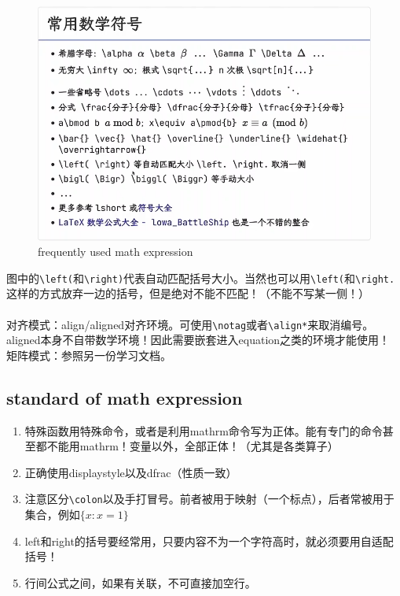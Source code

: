 \documentclass{article}
\begin{document}
\\
\begin{figure}[htbp]
    \includegraphics[scale=0.7]{pic/math-expression.png} \caption{frequently used math expression}\label{pic1}
\end{figure}
图中的\verb|\left(|和\verb|\right)|代表自动匹配括号大小。当然也可以用\verb|\left(|和\verb|\right.|这样的方式放弃一边的括号，但是绝对不能不匹配！（不能不写某一侧！）\\
\\
对齐模式：align/aligned对齐环境。可使用\verb|\notag|或者\verb|\align*|来取消编号。\\
aligned本身不自带数学环境！因此需要嵌套进入equation之类的环境才能使用！
\\
矩阵模式：参照另一份学习文档。
\subsection{standard of math expression}
\begin{enumerate}
    \item 特殊函数用特殊命令，或者是利用mathrm命令写为正体。能有专门的命令甚至都不能用mathrm！变量以外，全部正体！（尤其是各类算子）
    \item 正确使用displaystyle以及dfrac（性质一致）
    \item 注意区分\verb|\colon|以及手打冒号。前者被用于映射（一个标点），后者常被用于集合，例如$\{x:x=1\}$
    \item left和right的括号要经常用，只要内容不为一个字符高时，就必须要用自适配括号！
    \item 行间公式之间，如果有关联，不可直接加空行。
\end{enumerate}
\end{document}
